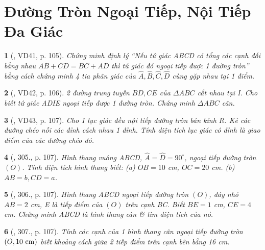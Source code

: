 \documentclass{article}
\newtheorem{baitoan}{}
\begin{document}

\section{Đường Tròn Ngoại Tiếp, Nội Tiếp Đa Giác}

\begin{baitoan}[\cite{Binh_Toan_9_tap_2}, VD41, p. 105]
	Chứng minh định lý ``Nếu tứ giác ABCD có tổng các cạnh đối bằng nhau $AB + CD = BC + AD$ thì tứ giác đó ngoại tiếp được 1 đường tròn'' bằng cách chứng minh 4 tia phân giác của $\widehat{A},\widehat{B},\widehat{C},\widehat{D}$ cùng gặp nhau tại 1 điểm.
\end{baitoan}

\begin{baitoan}[\cite{Binh_Toan_9_tap_2}, VD42, p. 106]
	2 đường trung tuyến $BD,CE$ của $\Delta ABC$ cắt nhau tại I. Cho biết tứ giác ADIE ngoại tiếp được 1 đường tròn. Chứng minh $\Delta ABC$ cân.
\end{baitoan}

\begin{baitoan}[\cite{Binh_Toan_9_tap_2}, VD43, p. 107]
	Cho 1 lục giác đều nội tiếp đường tròn bán kính $R$. Kẻ các đường chéo nối các đỉnh cách nhau 1 đỉnh. Tính diện tích lục giác có đỉnh là giao điểm của các đường chéo đó.
\end{baitoan}

\begin{baitoan}[\cite{Binh_Toan_9_tap_2}, 305., p. 107]
	Hình thang vuông ABCD, $\widehat{A} = \widehat{D} = 90^\circ$, ngoại tiếp đường tròn $(O)$. Tính diện tích hình thang biết: (a) $OB = 10$ {\rm cm}, $OC = 20$ {\rm cm}. (b) $AB = b,CD = a$.
\end{baitoan}

\begin{baitoan}[\cite{Binh_Toan_9_tap_2}, 306., p. 107]
	Hình thang ABCD ngoại tiếp đường tròn $(O)$, đáy nhỏ $AB = 2$ {\rm cm}, E là tiếp điểm của $(O)$ trên cạnh BC. Biết $BE = 1$ {\rm cm}, $CE = 4$ {\rm cm}. Chứng minh ABCD là hình thang cân \& tìm diện tích của nó.
\end{baitoan}

\begin{baitoan}[\cite{Binh_Toan_9_tap_2}, 307., p. 107]
	Tính các cạnh của 1 hình thang cân ngoại tiếp đường tròn $(O,10\ {\rm cm})$ biết khoảng cách giữa 2 tiếp điểm trên cạnh bên bằng {\rm16 cm}.
\end{baitoan}
\end{document}
